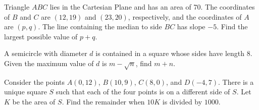 %	















\begin{question}[name={2005 AIME I, \href{https://artofproblemsolving.com/community/c4p366697}{Problem 10}}]
	Triangle $ABC$ lies in the Cartesian Plane and has an area of 70. The coordinates of $B$ and $C$ are $(12,19)$ and $(23,20)$, respectively, and the coordinates of $A$ are $(p,q)$. The line containing the median to side $BC$ has slope $-5$. Find the largest possible value of $p+q$.	
\end{question}


%	












\begin{question}[name={2005 AIME I, \href{https://artofproblemsolving.com/community/c4p366826}{Problem 11}}]
	A semicircle with diameter $d$ is contained in a square whose sides have length $8$. Given the maximum value of $d$ is $m- \sqrt{n}$, find $m+n$.
\end{question}


%	










\begin{question}[name={2005 AIME I, \href{https://artofproblemsolving.com/community/c4p367840}{Problem 14}}]
	Consider the points $A(0,12)$, $B(10,9)$, $C(8,0)$, and $D(-4,7)$. There is a unique square $S$ such that each of the four points is on a different side of $S$. Let $K$ be the area of $S$. Find the remainder when $10K$ is divided by $1000$.
\end{question}


